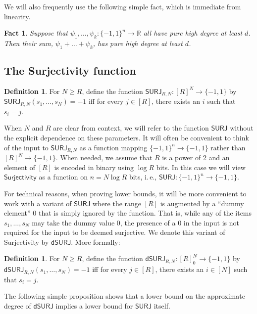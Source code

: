 \documentclass[11pt]{article}
\numberwithin{equation}{section}
\newtheorem{fact}[theorem]{Fact}
\theoremstyle{definition}
\newtheorem{definition}[theorem]{Definition}
\theoremstyle{plain}
\newcommand{\R}{\mathbb R}
\newcommand{\ie}{i.\,e.}
\newcommand{\SURJ}{\mathsf{ SURJ}}
\newcommand{\Surjectivity}{\mathsf{Surjectivity}}
\newcommand{\dumSURJ}{\mathsf{dSURJ}}
\newcommand{\bits}{\{-1,1\}}
\begin{document}
We will also frequently use the following simple fact, which is immediate from linearity.

\begin{fact}
	\label{sumfact}
	Suppose that $\psi_1, \dots, \psi_k \colon \bits^n \to \R$ all have pure high degree at least $d$. Then their sum, $\psi_1 + \dots + \psi_k$,
	has pure high degree at least $d$.
\end{fact}



\subsection{The Surjectivity function}


\begin{definition}\label{def:surj}
	For $N \ge R$, define the function $\SURJ_{R, N} : [R]^N \to \bits$ by $\SURJ_{R, N}(s_1, \dots, s_N) = -1$ iff for every $j \in [R]$, there exists an $i$ such that $s_i = j$.
\end{definition}

When $N$ and $R$ are clear from context, we will refer to the function $\SURJ$ without the explicit dependence on these parameters. It will often be convenient to think of the input to $\SURJ_{R, N}$ as a function
mapping $\bits^n \to \bits$ rather than $[R]^N \to \bits$. 
When needed, we assume that $R$ is a power of 2 and an element of $[R]$ is encoded in binary using $\log R$ bits.
In this case we will view $\Surjectivity$ as a function on $n=N\log R$ bits, \ie,  $\SURJ: \bits^{n} \to \bits$.

For technical reasons, when proving lower bounds, it will be more convenient to work with a variant of $\SURJ$ where the range $[R]$ is augmented by a ``dummy element'' $0$ that is simply ignored by the function. That is, while any of the items $s_1, \dots, s_N$ may take the dummy value $0$, the presence of a $0$ in the input is not required for the input to be deemed surjective. We denote this variant of Surjectivity by $\dumSURJ$. More formally:

\begin{definition}\label{def:dumsurj}
	For $N \ge R$, define the function $\dumSURJ_{R, N} : [R]_0^N \to \bits$ by $\dumSURJ_{R, N}(s_1, \dots, s_N) = -1$ iff for every $j \in [R]$, there exists an $i \in [N]$ such that $s_i = j$.
\end{definition}

The following simple proposition shows that a lower bound on the approximate degree of $\dumSURJ$ implies a lower bound for $\SURJ$ itself.
\end{document}
